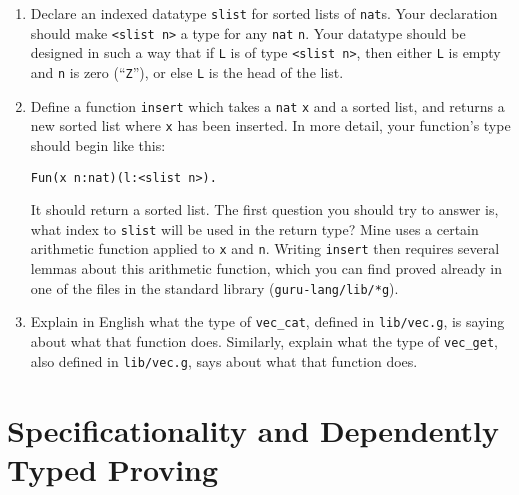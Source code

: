 \documentclass{book}[12pt]
\begin{document}
\begin{enumerate}

\item Declare an indexed datatype \texttt{slist} for sorted lists of
\texttt{nat}s.  Your declaration should make \texttt{<slist n>} a type
for any \texttt{nat} \texttt{n}.  Your datatype should be designed in
such a way that if \texttt{L} is of type \texttt{<slist n>}, then
either \texttt{L} is empty and \texttt{n} is zero (``\texttt{Z}''), or
else \texttt{L} is the head of the list.

\item Define a function \texttt{insert} which takes a \texttt{nat} \texttt{x} and
a sorted list, and returns a new sorted list where \texttt{x} has been inserted.
In more detail, your function's type should begin like this:

\begin{verbatim}
Fun(x n:nat)(l:<slist n>).
\end{verbatim}

\noindent It should return a sorted list.  The first question you
should try to answer is, what index to \texttt{slist} will be used in
the return type?  Mine uses a certain arithmetic function applied to
\texttt{x} and \texttt{n}.  Writing \texttt{insert} then requires
several lemmas about this arithmetic function, which you can find
proved already in one of the files in the standard library
(\texttt{guru-lang/lib/*g}).

\item Explain in English what the type of \texttt{vec\_cat}, defined
in \texttt{lib/vec.g}, is saying about what that function does.
Similarly, explain what the type of \texttt{vec\_get}, also defined in
\texttt{lib/vec.g}, says about what that function does.

\end{enumerate}

\chapter{Specificationality and Dependently Typed Proving}
\end{document}
